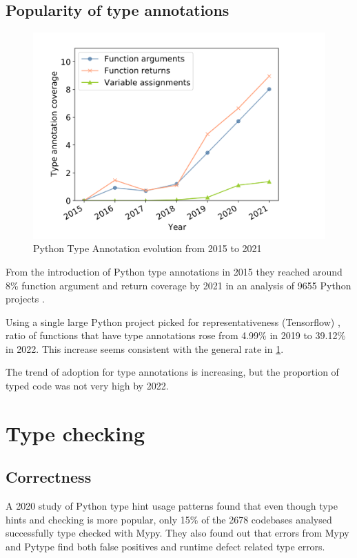 \subsection{Popularity of type annotations}

\begin{figure}
    \centering
    \includegraphics[width=0.5\linewidth]{Screenshot 2024-12-05 at 15.37.59.png}
    \caption{Python Type Annotation evolution from 2015 to 2021 \cite{di_grazia_evolution_2022}}
    \label{fig:annotation-evolution}
\end{figure}
From the introduction of Python type annotations in 2015 they reached around 8\% function argument and return coverage by 2021 in an analysis of 9655 Python projects \cite{di_grazia_evolution_2022}. 

Using a single large Python project picked for representativeness (Tensorflow) \cite{lin_towards_large_scale_2023}, ratio of functions that have type annotations rose from 4.99\% in 2019 to 39.12\% in 2022. This increase seems consistent with the general rate in \ref{fig:annotation-evolution}.

The trend of adoption for type annotations is increasing, but the proportion of typed code was not very high by 2022.

\section{Type checking}

\subsection{Correctness}

A 2020 study of Python type hint usage patterns \cite{rak-amnouykit_taleoftwo_2020} found that even though type hints and checking is more popular, only 15\% of the 2678 codebases analysed successfully type checked with Mypy. They also found out that errors from Mypy and Pytype find both false positives and runtime defect related type errors.

